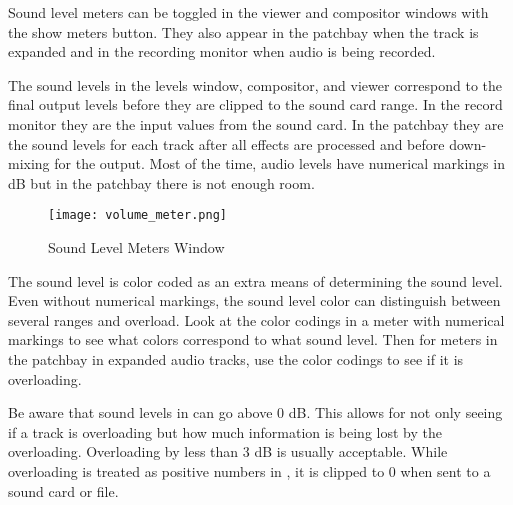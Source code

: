 Sound level meters can be toggled in the viewer and compositor windows with the show meters button.  
They also appear in the patchbay when the track is expanded and in the recording monitor when audio is being recorded. 

The sound levels in the levels window, compositor, and viewer correspond to the final output levels before they are clipped to the sound card range.  
In the record monitor they are the input values from the sound card.  
In the patchbay they are the sound levels for each track after all effects are processed and before down-mixing for the output.  
Most of the time, audio levels have numerical markings in dB but in the patchbay there is not enough room.

\begin{wrapfigure}[15]{O}{0.3\linewidth} 
	\centering
	\vspace{-4ex}
	\texttt{[image: volume\_meter.png]}
	\caption{Sound Level Meters Window}
	\label{fig:volume_meter}
\end{wrapfigure}

The sound level is color coded as an extra means of determining the sound level.  
Even without numerical markings, the sound level color can distinguish between several ranges and overload.  
Look at the color codings in a meter with numerical markings to see what colors correspond to what sound level.  
Then for meters in the patchbay in expanded audio tracks, use the color codings to see if it is overloading.

Be aware that sound levels in \CGG{} can go above 0 dB.  
This allows for not only seeing if a track is overloading but how much information is being lost by the overloading.  
Overloading by less than 3 dB is usually acceptable.  
While overloading is treated as positive numbers in \CGG{}, it is clipped to 0 when sent to a sound card or file.


